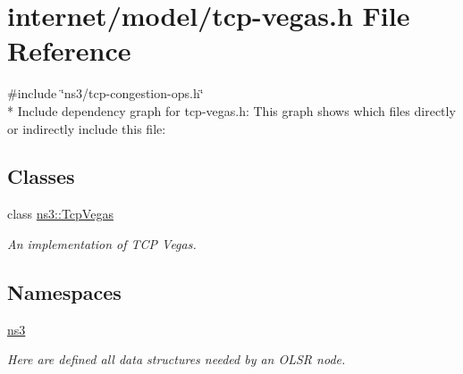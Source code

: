 \hypertarget{tcp-vegas_8h}{}\section{internet/model/tcp-\/vegas.h File Reference}
\label{tcp-vegas_8h}
{\ttfamily \#include \char`\"{}ns3/tcp-\/congestion-\/ops.\+h\char`\"{}}\\*
Include dependency graph for tcp-\/vegas.h\+:
This graph shows which files directly or indirectly include this file\+:
\subsection*{Classes}
\begin{DoxyCompactItemize}
\item 
class \hyperlink{classns3_1_1TcpVegas}{ns3\+::\+Tcp\+Vegas}
\begin{DoxyCompactList}\small\item\em An implementation of T\+CP Vegas. \end{DoxyCompactList}\end{DoxyCompactItemize}
\subsection*{Namespaces}
\begin{DoxyCompactItemize}
\item 
 \hyperlink{namespacens3}{ns3}
\begin{DoxyCompactList}\small\item\em Here are defined all data structures needed by an O\+L\+SR node. \end{DoxyCompactList}\end{DoxyCompactItemize}
